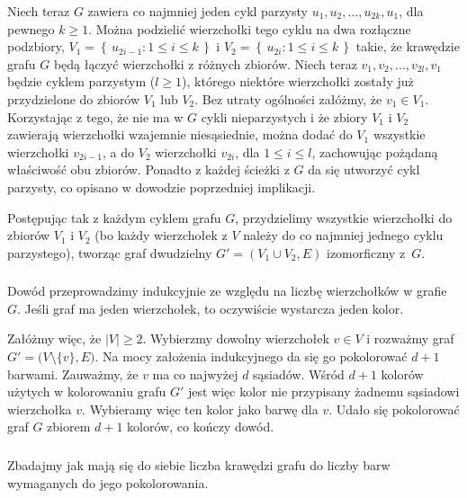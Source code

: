 Niech teraz $G$ zawiera co najmniej jeden cykl parzysty $u_1,u_2,\dots,u_{2k},u_1$, dla pewnego $k\ge1$. Można podzielić wierzchołki tego cyklu na dwa rozłączne podzbiory, $V_1 = \left\{\,u_{2i-1}:1\le i\le k\,\right\}$ i $V_2 = \left\{\,u_{2i}:1\le i\le k\,\right\}$ takie, że krawędzie grafu $G$ będą łączyć wierzchołki z różnych zbiorów. Niech teraz $v_1,v_2,\dots,v_{2l},v_1$ będzie cyklem parzystym ($l\ge1$), którego niektóre wierzchołki zostały już przydzielone do zbiorów $V_1$ lub $V_2$. Bez utraty ogólności załóżmy, że $v_1\in V_1$. Korzystając z tego, że nie ma w $G$ cykli nieparzystych i że zbiory $V_1$ i $V_2$ zawierają wierzchołki wzajemnie niesąsiednie, można dodać do $V_1$ wszystkie wierzchołki $v_{2i-1}$, a do $V_2$ wierzchołki $v_{2i}$, dla $1\le i\le l$, zachowując pożądaną właściwość obu zbiorów. Ponadto z każdej ścieżki z $G$ da się utworzyć cykl parzysty, co opisano w dowodzie poprzedniej implikacji.

Postępując tak z każdym cyklem grafu $G$, przydzielimy wszystkie wierzchołki do zbiorów $V_1$ i $V_2$ (bo każdy wierzchołek z $V$ należy do co najmniej jednego cyklu parzystego), tworząc graf dwudzielny $G'=(V_1\cup V_2,E)$ izomorficzny z~$G$.

\subsubsection{} %
Dowód przeprowadzimy indukcyjnie ze względu na liczbę wierzchołków w grafie $G$. Jeśli graf ma jeden wierzchołek, to oczywiście wystarcza jeden kolor.

Załóżmy więc, że $|V|\ge2$. Wybierzmy dowolny wierzchołek $v\in V$ i rozważmy graf $G'=\bigl(V\setminus\!\{v\},E\bigr)$. Na mocy założenia indukcyjnego da się go pokolorować $d+1$ barwami. Zauważmy, że $v$ ma co najwyżej $d$ sąsiadów. Wśród $d+1$ kolorów użytych w kolorowaniu grafu $G'$ jest więc kolor nie przypisany żadnemu sąsiadowi wierzchołka $v$. Wybieramy więc ten kolor jako barwę dla $v$. Udało się pokolorować graf $G$ zbiorem $d+1$ kolorów, co kończy dowód.

\subsubsection{} %
Zbadajmy jak mają się do siebie liczba krawędzi grafu do liczby barw wymaganych do jego pokolorowania.

